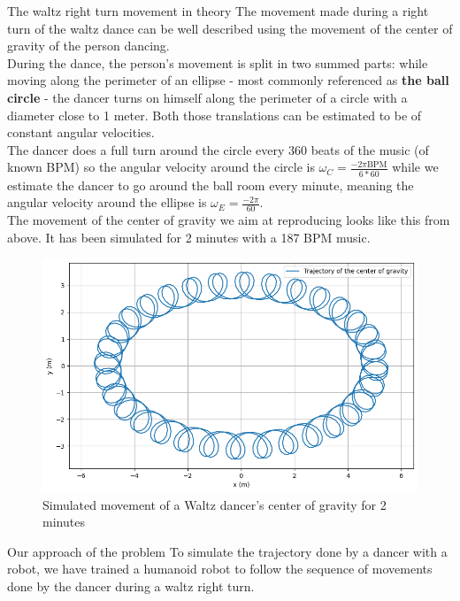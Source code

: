 \documentclass[final]{beamer}
\newlength{\colwidth}
\begin{document}
\begin{frame}[t]
\begin{columns}[t]
\begin{column}{\colwidth}
  \begin{block}{The waltz right turn movement in theory}
The movement made during a right turn of the waltz dance can be well described using the movement of the center of gravity of the person dancing. \\ 
During the dance, the person's movement is split in two summed parts: while moving along the perimeter of an ellipse - most commonly referenced as \textbf{the ball circle} - the dancer turns on himself along the perimeter of a circle with a diameter close to 1 meter. 
Both those translations can be estimated to be of constant angular velocities. \\ 
The dancer does a full turn around the circle every 360 beats of the music (of known BPM) so the angular velocity around the circle is $\omega_C = \frac{-2\pi \text{BPM}}{6*60}$ while we estimate the dancer to go around the ball room every minute, meaning the angular velocity around the ellipse is $\omega_E = \frac{-2\pi}{60}$. \\ 
The movement of the center of gravity we aim at reproducing looks like this from above. It has been simulated for 2 minutes with a 187 BPM music.
    \begin{figure}
      \centering
      \includegraphics[width = 0.99 \columnwidth]{img/waltz_cog_movement.png} 
      \caption{Simulated movement of a Waltz dancer's center of gravity for 2 minutes}
    \end{figure}
  \end{block}
 \begin{alertblock}{Our approach of the problem}
To simulate the trajectory done by a dancer with a robot, we have trained a humanoid robot to follow the sequence of movements done by the dancer during a waltz right turn. \\ 

\end{alertblock}
\end{column}
\end{columns}
\end{frame}
\end{document}

